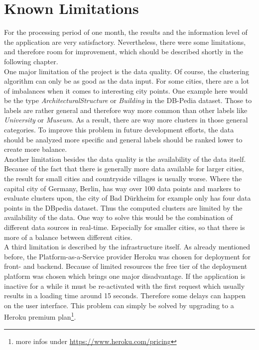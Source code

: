 \section{Known Limitations}
For the processing period of one month, the results and the information level of the application are very satisfactory. Nevertheless, there were some limitations, and therefore room for improvement, which should be described shortly in the following chapter.
\\

One major limitation of the project is the data quality. Of course, the clustering algorithm can only be as good as the data input. For some cities, there are a lot of imbalances when it comes to interesting city points. One example here would be the type \textit{ArchitecturalStructure} or \textit{Building} in the DB-Pedia dataset. Those to labels are rather general and therefore way more common than other labels like \textit{University} or \textit{Museum}. As a result, there are way more clusters in those general categories. To improve this problem in future development efforts, the data should be analyzed more specific and general labels should be ranked lower to create more balance.
\\

Another limitation besides the data quality is the availability of the data itself. Because of the fact that there is generally more data available for larger cities, the result for small cities and countryside villages is usually worse. Where the capital city of Germany, Berlin, has way over 100 data points and markers to evaluate clusters upon, the city of Bad D\"urkheim for example only has four data points in the DBpedia dataset. Thus the computed clusters are limited by the availability of the data. One way to solve this would be the combination of different data sources in real-time. Especially for smaller cities, so that there is more of a balance between different cities. 
\\

A third limitation is described by the infrastructure itself. As already mentioned before, the Platform-as-a-Service provider Heroku was chosen for deployment for front- and backend. Because of limited resources the free tier of the deployment platform was chosen which brings one major disadvantage. If the application is inactive for a while it must be re-activated with the first request which usually results in a loading time around 15 seconds. Therefore some delays can happen on the user interface. This problem can simply be solved by upgrading to a Heroku premium plan\footnote{more infos under \url{https://www.heroku.com/pricing}}.
